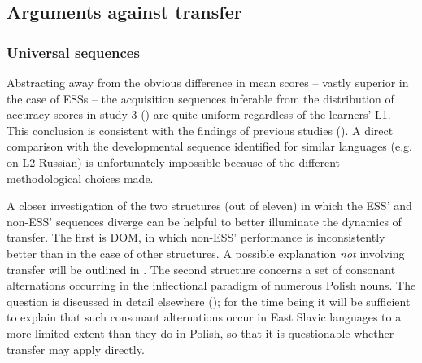 \documentclass[output=paper,            colorlinks, citecolor=brown            		  ]{langscibook}
\begin{document}
\subsection{Arguments against transfer}\label{sec:saturno:4.2}
\subsubsection{Universal sequences}\label{sec:saturno:4.2.1}

Abstracting away from the obvious difference in mean scores – vastly superior in the case of ESSs – the acquisition sequences inferable from the distribution of accuracy scores in study 3 () are quite uniform regardless of the learners’ L1. This conclusion is consistent with the findings of previous studies (). A direct comparison with the developmental sequence identified for similar languages (e.g. \citealt{ArtoniMagnani2015} on L2 Russian) is unfortunately impossible because of the different methodological choices made.

A closer investigation of the two structures (out of eleven) in which the ESS’ and non-ESS’ sequences diverge can be helpful to better illuminate the dynamics of transfer. The first is DOM, in which non-ESS’ performance is inconsistently better than in the case of other structures. A possible explanation \textit{not} involving transfer will be outlined in  . The second structure concerns a set of consonant alternations occurring in the inflectional paradigm of numerous Polish nouns. The question is discussed in detail elsewhere (\citealt{Saturno2023}); for the time being it will be sufficient to explain that such consonant alternations occur in East Slavic languages to a more limited extent than they do in Polish, so that it is questionable whether transfer may apply directly.
\end{document}
